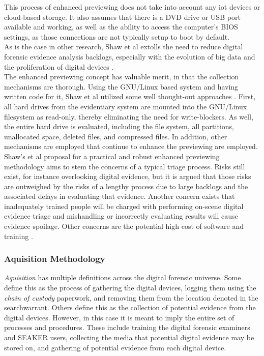 \documentclass[12pt]{article}
\begin{document}
This process of enhanced previewing does not take into account any \gls{iot} devices or 
cloud-based storage. It also assumes that there is a DVD drive or USB port available and
working, as well as the ability to access the computer's BIOS settings, as those
connections are not typically setup to boot by default.\\

As is the case in other research, Shaw et al extolls the need to reduce digital
forensic evidence analysis backlogs, especially with the evolution of big data and
the proliferation of digital devices \cite{shaw2013practical}.\\

The enhanced previewing concept has valuable merit, in that the collection mechanisms
are thorough.  Using the GNU/Linux based system and having written code for it, Shaw 
et al utilized some well thought-out approaches \cite{shaw2013practical}.  First, all
hard drives from the evidentiary system are mounted into the GNU/Linux filesystem as
read-only, thereby eliminating the need for write-blockers.  As well, the entire hard
drive is evaluated, including the file system, all partitions, unallocated space,
deleted files, and compressed files.  In addition, other mechanisms are employed that
continue to enhance the previewing are employed.\\

Shaw's et al proposal for a practical and robust enhanced previewing methodology aims to stem
the concerns of a typical triage process.  Risks still exist, for instance overlooking
digital evidence, but it is argued that those risks are outweighed by the risks of a
lengthy process due to large backlogs and the associated delays in evaluating that
evidence.  Another concern exists that inadequately trained people will be charged
with performing on-scene digital evidence triage and mishandling or incorrectly
evaluating results will cause evidence spoilage. Other concerns are the potential high
cost of software and training \cite{shaw2013practical}.\\

\subsubsection{Aquisition Methodology}

{\em Aquisition} has multiple definitions across the digital forensic universe.
Some define this as the process of gathering the digital devices, logging them using the 
{\em chain of custody} paperwork, and removing them from the location denoted in the
\gls{searchwarrant}.  Others define this as the collection of potential evidence from the digital
devices.  However, in this case it is meant to imply the entire set of processes and
procedures.  These include training the digital forensic examiners and SEAKER users, 
collecting the media that potential digital evidence may be stored on, and
gathering of potential evidence from each digital device.\\
\end{document}
